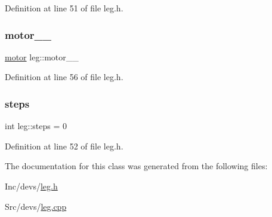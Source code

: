 Definition at line 51 of file leg.\+h.

\mbox{\label{classleg_af069ccf74985349429d9bb5f69e751ab}} 
\subsubsection{\texorpdfstring{motor\_\_}{motor\_\_}}
{\footnotesize\ttfamily \mbox{\hyperlink{classmotor}{motor}} leg\+::motor\+\_\+\+\_\+\hspace{0.3cm}{\ttfamily [private]}}



Definition at line 56 of file leg.\+h.

\mbox{\label{classleg_a8056ae3fb3e8df59e560316932a2be0d}} 
\subsubsection{\texorpdfstring{steps}{steps}}
{\footnotesize\ttfamily int leg\+::steps = 0}



Definition at line 52 of file leg.\+h.



The documentation for this class was generated from the following files\+:\begin{DoxyCompactItemize}
\item 
Inc/devs/\mbox{\hyperlink{leg_8h}{leg.\+h}}\item 
Src/devs/\mbox{\hyperlink{leg_8cpp}{leg.\+cpp}}\end{DoxyCompactItemize}
